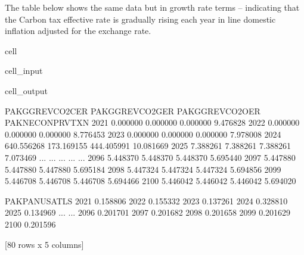 \documentclass[letterpaper,10pt,english]{jupyterBook}
\begin{document}
\sphinxAtStartPar
The table below shows the same data but in growth rate terms – indicating that the Carbon tax effective rate is gradually rising each year in line domestic inflation adjusted for the exchange rate.

\begin{sphinxuseclass}{cell}\begin{sphinxVerbatimInput}

\begin{sphinxuseclass}{cell_input}
\begin{sphinxVerbatim}[commandchars=\\\{\}]
\PYG{p}{[}\PYG{p}{]}
\end{sphinxVerbatim}

\end{sphinxuseclass}\end{sphinxVerbatimInput}
\begin{sphinxVerbatimOutput}

\begin{sphinxuseclass}{cell_output}
\begin{sphinxVerbatim}[commandchars=\\\{\}]
      PAKGGREVCO2CER  PAKGGREVCO2GER  PAKGGREVCO2OER  PAKNECONPRVTXN   
2021        0.000000        0.000000        0.000000        9.476828  \PYGZbs{}
2022        0.000000        0.000000        0.000000        8.776453   
2023        0.000000        0.000000        0.000000        7.978008   
2024     \PYGZhy{}640.556268     \PYGZhy{}173.169155     \PYGZhy{}444.405991       10.081669   
2025        7.388261        7.388261        7.388261        7.073469   
...              ...             ...             ...             ...   
2096        5.448370        5.448370        5.448370        5.695440   
2097        5.447880        5.447880        5.447880        5.695184   
2098        5.447324        5.447324        5.447324        5.694856   
2099        5.446708        5.446708        5.446708        5.694466   
2100        5.446042        5.446042        5.446042        5.694020   

      PAKPANUSATLS  
2021     \PYGZhy{}0.158806  
2022     \PYGZhy{}0.155332  
2023     \PYGZhy{}0.137261  
2024     \PYGZhy{}0.328810  
2025     \PYGZhy{}0.134969  
...            ...  
2096     \PYGZhy{}0.201701  
2097     \PYGZhy{}0.201682  
2098     \PYGZhy{}0.201658  
2099     \PYGZhy{}0.201629  
2100     \PYGZhy{}0.201596  

[80 rows x 5 columns]
\end{sphinxVerbatim}

\end{sphinxuseclass}\end{sphinxVerbatimOutput}

\end{sphinxuseclass}
\end{document}
